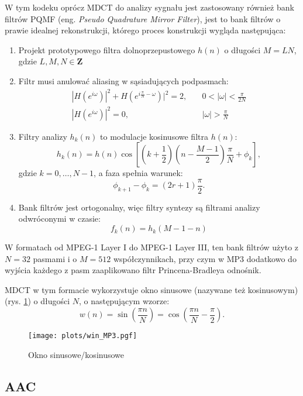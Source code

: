 \documentclass[pl,12pt]{aghdpl}
\let\Oldsubsection\subsection%
\renewcommand{\subsection}{\FloatBarrier\Oldsubsection}
\begin{document}
W tym kodeku oprócz MDCT do analizy sygnału jest zastosowany również bank
filtrów PQMF (eng. \textit{Pseudo Quadrature Mirror Filter}), jest to bank filtrów
o prawie idealnej rekonstrukcji, którego proces konstrukcji wygląda
następująca:
\begin{enumerate}
  \item Projekt prototypowego filtra dolnoprzepustowego $h(n)$ o długości $M =
    LN$, gdzie $L, M, N \in \bm Z$
  \item Filtr musi anulować aliasing w sąsiadujących podpasmach: \[
      \begin{array}{rl}
        |H(e^{i\omega})|^2 + H(e^{i\frac{\pi}{N}-\omega})|^2 = 2, &
        \quad0<|\omega|<\frac{\pi}{2N} \\
        |H(e^{i\omega})|^2 = 0, & \quad|\omega| > \frac{\pi}{N}
      \end{array}\]
  \item Filtry analizy $h_k(n)$ to modulacje kosinusowe filtra $h(n)$:\[
      h_k(n) = h(n)\cos\left[\left(k+\frac{1}{2}\right)
      \left(n-\frac{M-1}{2}\right)\frac{\pi}{N}+\phi_k\right],\]
      gdzie $k = 0,\dotsc,N-1$, a faza spełnia warunek:\[
      \phi_{k+1}-\phi_k = (2r+1)\frac{\pi}{2}.\]
  \item Bank filtrów jest ortogonalny, więc filtry syntezy są filtrami analizy
    odwróconymi w czasie:\[
      f_k(n) = h_k(M-1-n)\]
\end{enumerate}
W formatach od MPEG-1 Layer I do MPEG-1 Layer III, ten bank filtrów użyto z $N = 32$
pasmami i o $M = 512$ współczynnikach, przy czym w MP3 dodatkowo do wyjścia każdego z
pasm zaaplikowano filtr Princena-Bradleya {\color{red}odnośnik}.

MDCT w tym formacie wykorzystuje okno sinusowe (nazywane też kosinusowym) (rys.
\ref{fig:win_MP3}) o długości $N$, o następującym wzorze:
\begin{equation}\label{eq:sine_win}
  w(n) = \sin\left(\frac{\pi n}{N}\right) = \cos\left(\frac{\pi n}{N} - \frac{\pi}{2}\right).
\end{equation}

\begin{figure}[!tbh]
  \centering
  \texttt{[image: plots/win\_MP3.pgf]}
  \caption{Okno sinusowe/kosinusowe}
  \label{fig:win_MP3}
\end{figure}

\subsection{AAC}
\end{document}
